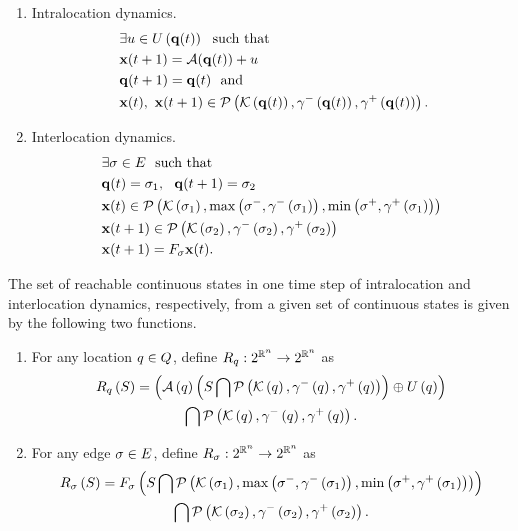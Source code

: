 \begin{enumerate}
\item Intralocation dynamics.
\begin{align}~\label{eqn:intralocation}
\begin{split}
& \exists u\in U\left({\bf q}(t)\right)~~\text{such that}\\
& {\bf x}(t+1) = \mathcal{A}({\bf q}(t))+u\\ 
& {\bf q}(t+1) = {\bf q}(t)~~
\text{and}\\
& {\bf x}(t),~{\bf x}(t+1)\in\mathcal{P}\left(\mathcal{K}\left({\bf q}(t)\right),\gamma^-\left({\bf q}(t)\right),\gamma^+\left({\bf q}(t)\right)\right).
\end{split}
\end{align}
\item Interlocation dynamics.
\begin{align} 
\begin{split}
& \exists \sigma\in E~~\text{such that}\\
& {\bf q}(t)=\sigma_{1},~~{\bf q}(t+1)=\sigma_{2}\\
& {\bf x}(t)\in\mathcal{P}\left(\mathcal{K}\left(\sigma_{1}\right),\max\left(\sigma^-,\gamma^-\left(\sigma_{1}\right)\right),\min\left(\sigma^+,\gamma^+\left(\sigma_{1}\right)\right)\right) \\
& {\bf x}(t+1)\in \mathcal{P}\left(\mathcal{K}\left(\sigma_{2}\right),\gamma^-\left(\sigma_{2}\right),\gamma^+\left(\sigma_{2}\right)\right)\\
& {\bf x}(t+1) = F_{\sigma}{\bf x}(t).
\end{split}
\end{align}
\end{enumerate}

The set of reachable continuous states in one time step of
intralocation and interlocation dynamics, respectively, from a given
set of continuous states is given by the following two functions.
\begin{enumerate}
\item For any location $q\in Q$, define $R_{q}:2^{\mathbb{R}^n}\rightarrow 2^{\mathbb{R}^n}$ as
\begin{multline*}
R_{q}\left(S\right) = \left(\mathcal{A}\left(q\right)\left(S\bigcap\mathcal{P}\left(\mathcal{K}\left(q\right),\gamma^-\left(q\right),\gamma^+\left(q\right)\right)\right)\oplus U\left(q\right)\right)\\  \bigcap \mathcal{P}\left(\mathcal{K}\left(q\right),\gamma^-\left(q\right),\gamma^+\left(q\right)\right).
\end{multline*}
\item For any edge $\sigma\in E$, define
  $R_{\sigma}:2^{\mathbb{R}^n}\rightarrow 2^{\mathbb{R}^n}$ as
\begin{multline*}
R_{\sigma}\left(S\right) =  F_{\sigma}\left(S\bigcap \mathcal{P}\left(\mathcal{K}\left(\sigma_{1}\right),\max\left(\sigma^-,\gamma^-\left(\sigma_{1}\right)\right),\min\left(\sigma^+,\gamma^+\left(\sigma_{1}\right) \right)\right)\right) \\ \bigcap\mathcal{P}\left(\mathcal{K}\left(\sigma_{2}\right),\gamma^-\left(\sigma_{2}\right),\gamma^+\left(\sigma_{2}\right)\right).
\end{multline*}
\end{enumerate}

